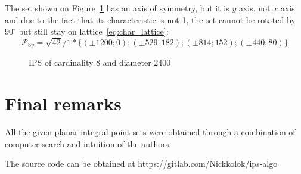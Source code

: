 \documentclass[12pt]{article}
\theoremstyle{theorem}
\theoremstyle{dfn}
\theoremstyle{remark}
\begin{document}
The set shown on Figure~\ref{8_2400_42_56f3} has an axis of symmetry, but it is $y$ axis, not $x$ axis
and due to the fact that its characteristic is not 1,
the set cannot be rotated by $90^\circ$ but still stay on lattice~\eqref{eq:char_lattice}:
\begin{equation}
	\mathcal{P}_{8y}=
	\sqrt{42}/1*\{( \pm1200 ; 0);
	( \pm529 ; 182);
	( \pm814 ; 152);
	( \pm440 ; 80)
	\}
\end{equation}

\begin{figure}[h!]
	\parbox{1\linewidth}{\caption{IPS of cardinality 8 and diameter 2400}
	\label{8_2400_42_56f3}}
\end{figure}



\section{Final remarks}
All the given planar integral point sets were obtained through a combination of computer search and intuition of the authors.

The source code can be obtained at https://gitlab.com/Nickkolok/ips-algo

\end{document}
